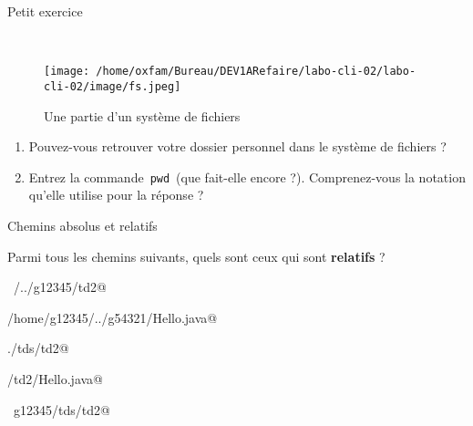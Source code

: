 \documentclass[a4paper,11pt]{article}
\begin{document}
\begin{Exercice}{Petit exercice}
	
\textcolor{white}{.} \par

\par
\begin{figure}[hbt]
	\begin{center}
		\texttt{[image: /home/oxfam/Bureau/DEV1ARefaire/labo-cli-02/labo-cli-02/image/fs.jpeg]}
	\end{center}
	
	\caption[Une partie d'un syst\`eme de fichiers]{Une partie d'un syst\`eme de fichiers}
\end{figure}

\begin{enumerate}
	
	\item 
	Pouvez-vous retrouver votre dossier personnel dans le syst\`eme de fichiers ?  
	
	\item 
	Entrez la commande \,\verb|pwd|\, (que fait-elle encore ?). 
	Comprenez-vous la notation qu'elle utilise pour la r\'eponse ?
	
\end{enumerate}

\end{Exercice}

\begin{Exercice}{Chemins absolus et relatifs}
	\textcolor{white}{.} \par
	Parmi tous les chemins suivants, quels sont ceux qui sont 
	\textbf{relatifs} ?
	
	\begin{steps} 
		
		\item \verb@~/../g12345/td2@
		
		\item \verb@/home/g12345/../g54321/Hello.java@
		
		\item \verb@./tds/td2@
		
		\item \verb@tds/td2/Hello.java@
		
		\item \verb@~g12345/tds/td2@
		
	\end{steps} 
\end{Exercice}
\end{document}
